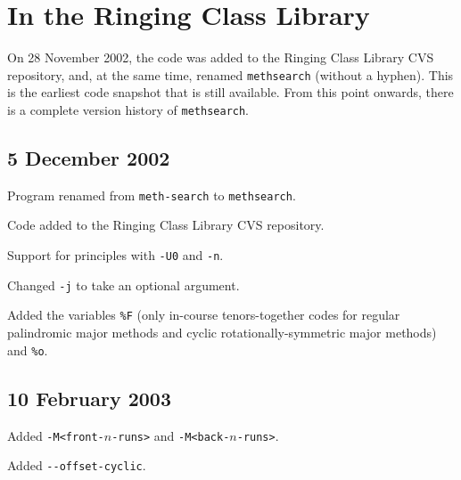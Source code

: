 \documentclass[a4paper,11pt,oneside]{book}
\def\methsearch{\texttt{meth\-search}}
\begin{document}
\section{In the Ringing Class Library}

On 28 November 2002, the code was added to the Ringing Class Library%
 CVS repository, and, at the
same time, renamed \verb+methsearch+ (without a hyphen).  This is the 
earliest code snapshot that is still available.  From this point onwards,
there is a complete version history of \methsearch.

\subsection{5 December 2002}
\begin{list}{}{\leftmargin=1em\itemsep=0em}
\item Program renamed from \texttt{meth-search} to \methsearch.
\item Code added to the Ringing Class Library CVS repository.
\item Support for principles with \verb+-U0+ and \verb+-n+.
\item Changed \verb+-j+ to take an optional argument.
\item Added the variables \verb+%F+ (only in-course tenors-together codes
for regular palindromic major methods and cyclic rotationally-symmetric
major methods) and \verb+%o+.
\end{list}

\subsection{10 February 2003}
\begin{list}{}{\leftmargin=1em\itemsep=0em}
\item Added \verb+-M<front-+$n$\verb+-runs>+ and 
\verb+-M<back-+$n$\verb+-runs>+.
\item Added \verb+--offset-cyclic+.
\end{list}
\end{document}
